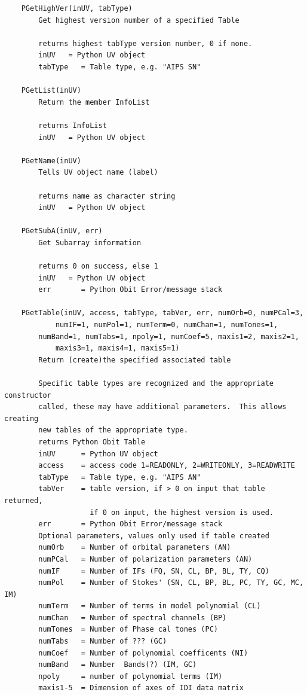 \documentclass[11pt]{report}
\begin{document}
\begin{verbatim}
    PGetHighVer(inUV, tabType)
        Get highest version number of a specified Table
        
        returns highest tabType version number, 0 if none.
        inUV   = Python UV object
        tabType   = Table type, e.g. "AIPS SN"
    
    PGetList(inUV)
        Return the member InfoList
        
        returns InfoList
        inUV   = Python UV object
    
    PGetName(inUV)
        Tells UV object name (label)
        
        returns name as character string
        inUV   = Python UV object
    
    PGetSubA(inUV, err)
        Get Subarray information
        
        returns 0 on success, else 1
        inUV   = Python UV object
        err       = Python Obit Error/message stack
    
    PGetTable(inUV, access, tabType, tabVer, err, numOrb=0, numPCal=3,    
            numIF=1, numPol=1, numTerm=0, numChan=1, numTones=1,
	    numBand=1, numTabs=1, npoly=1, numCoef=5, maxis1=2, maxis2=1,
            maxis3=1, maxis4=1, maxis5=1)
        Return (create)the specified associated table
        
        Specific table types are recognized and the appropriate constructor
        called, these may have additional parameters.  This allows creating
        new tables of the appropriate type.
        returns Python Obit Table
        inUV      = Python UV object
        access    = access code 1=READONLY, 2=WRITEONLY, 3=READWRITE
        tabType   = Table type, e.g. "AIPS AN"
        tabVer    = table version, if > 0 on input that table returned,
                    if 0 on input, the highest version is used.
        err       = Python Obit Error/message stack
        Optional parameters, values only used if table created
        numOrb    = Number of orbital parameters (AN)
        numPCal   = Number of polarization parameters (AN)
        numIF     = Number of IFs (FQ, SN, CL, BP, BL, TY, CQ)
        numPol    = Number of Stokes' (SN, CL, BP, BL, PC, TY, GC, MC, IM)
        numTerm   = Number of terms in model polynomial (CL)
        numChan   = Number of spectral channels (BP)
        numTomes  = Number of Phase cal tones (PC)
        numTabs   = Number of ??? (GC)
        numCoef   = Number of polynomial coefficents (NI)
        numBand   = Number  Bands(?) (IM, GC)
        npoly     = number of polynomial terms (IM)
        maxis1-5  = Dimension of axes of IDI data matrix
    

\end{verbatim}
\end{document}
